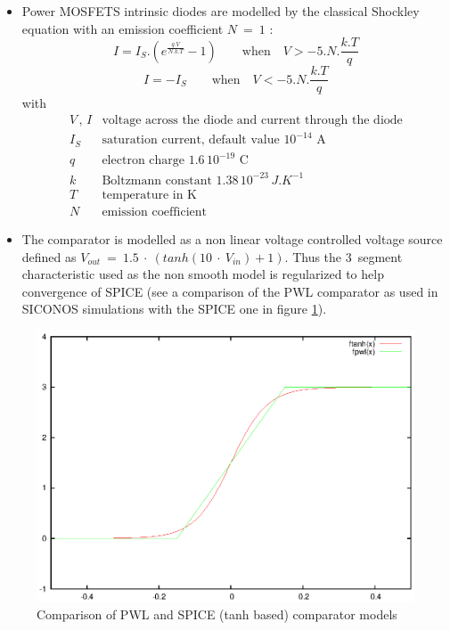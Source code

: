 \documentclass{article}
\begin{document}
\begin{itemize}
\item Power MOSFETS intrinsic diodes are modelled by the classical Shockley equation with an emission
coefficient $N~=~1$ :
\[ I = I_S.({e^{\frac{q.V}{N.k.T}} - 1}) \qquad \textrm{when} \quad V > -5.N.\frac{k.T}{q} \]
\[ I = -I_S \qquad  \textrm{when} \quad V < -5.N.\frac{k.T}{q} \]
with
\[
\begin{array}{ll}
V\,,\,I & \textrm{voltage across the diode and current through the diode}\\
I_S & \textrm{saturation current, default value $10^{-14}$~A}\\
q & \textrm{electron charge $1.6\,10^{-19}$~C}\\
k & \textrm{Boltzmann constant $1.38\,10^{-23}\,J.K^{-1}$}\\
T & \textrm{temperature in K}\\
N & \textrm{emission coefficient}
\end{array}
\]
\item The comparator is modelled as a non linear voltage controlled voltage source defined as $V_{out}~=~1.5~\cdot~(tanh(10~\cdot~V_{in}) + 1)$.
Thus the 3~segment characteristic used as the non smooth model is regularized to help convergence of SPICE
(see a comparison of the PWL comparator as used in SICONOS simulations with the SPICE one in figure \ref{fig-comparator-models}).
\end{itemize}

\begin{figure}[hbtp]
\begin{center}
\includegraphics[scale=1.0,angle=0]{./figure/comparators.eps}
\end{center}
\caption{Comparison of PWL and SPICE (tanh based) comparator models}
\label{fig-comparator-models}
\end{figure}
\end{document}
